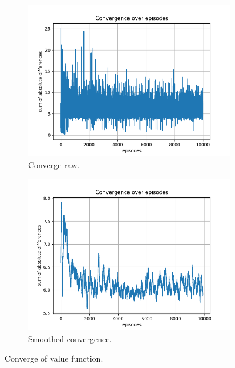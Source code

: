 \documentclass{assignment}
\begin{document}
\begin{figure}[H]
    \begin{subfigure}{0.5\textwidth}
        \includegraphics[width=\textwidth]{figures/convergence_q/alpha_sweep/convergence_Q_alpha_0.1_gamma_0.95_epislon_0.2.png}
    \caption{Converge raw.}
    \end{subfigure}\hfill
    \begin{subfigure}{0.5\textwidth}
        \includegraphics[width=\textwidth]{figures/convergence_q/alpha_sweep/convergence_Q_smoothed_alpha_0.1_gamma_0.95_epislon_0.2.png}
    \caption{Smoothed convergence.}
    \end{subfigure}
    \caption{Converge of value function.}
    \label{fig:alpha_0.1_q_learning_convergence}
\end{figure}
\end{document}
